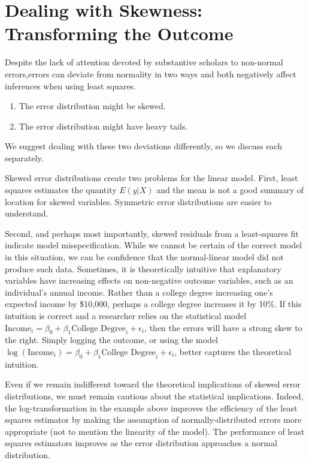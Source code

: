 \documentclass[12pt]{article}
\begin{document}
\section*{Dealing with Skewness: Transforming the Outcome}

Despite the lack of attention devoted by substantive scholars to non-normal errors,errors can deviate from normality in two ways and both negatively affect inferences when using least squares. 
\begin{enumerate}
\item The error distribution might be skewed. 
\item The error distribution might have heavy tails. 
\end{enumerate}

We suggest dealing with these two deviations differently, so we discuss each separately.

Skewed error distributions create two problems for the linear model. 
First, least squares estimates the quantity $E(y | X)$ and the mean is not a good summary of location for skewed variables. 
Symmetric error distributions are easier to understand. 

Second, and perhaps most importantly, skewed residuals from a least-squares fit indicate model misspecification. 
While we cannot be certain of the correct model in this situation, we can be confidence that the normal-linear model did not produce such data.
Sometimes, it is theoretically intuitive that explanatory variables have increasing effects on non-negative outcome variables, such as an individual's annual income. 
Rather than a college degree increasing one's expected income by \$10,000, perhaps a college degree increases it by 10\%. 
If this intuition is correct and a researcher relies on the statistical model $\text{Income}_i = \beta_0 + \beta_1 \text{College Degree}_i + \epsilon_i$, then the errors will have a strong skew to the right. Simply logging the outcome, or using the model $\log (\text{Income}_i) = \beta_0 + \beta_1 \text{College Degree}_i + \epsilon_i$, better captures the theoretical intuition.

Even if we remain indifferent toward the theoretical implications of skewed error distributions, we must remain cautious about the statistical implications. 
Indeed, the log-transformation in the example above improves the efficiency of the least squares estimator by making the assumption of normally-distributed errors more appropriate (not to mention the linearity of the model).
The performance of least squares estimators improves as the error distribution approaches a normal distribution. 
\end{document}
